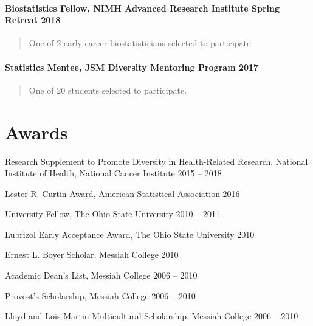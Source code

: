 \documentclass[
  fleqn, oneside]{article}
\begin{document}
\hypertarget{biostatistics-fellow-nimh-advanced-research-institute-spring-retreat-2018}{%
\paragraph{\texorpdfstring{Biostatistics Fellow, NIMH Advanced Research
Institute Spring Retreat
\hfill 2018}{Biostatistics Fellow, NIMH Advanced Research Institute Spring Retreat 2018}}\label{biostatistics-fellow-nimh-advanced-research-institute-spring-retreat-2018}}

\begin{quote}
One of 2 early-career biostatisticians selected to participate.
\end{quote}

\hypertarget{statistics-mentee-jsm-diversity-mentoring-program-2017}{%
\paragraph{\texorpdfstring{Statistics Mentee, JSM Diversity Mentoring
Program
\hfill 2017}{Statistics Mentee, JSM Diversity Mentoring Program 2017}}\label{statistics-mentee-jsm-diversity-mentoring-program-2017}}

\begin{quote}
One of 20 students selected to participate.
\end{quote}

\hypertarget{awards}{%
\section{Awards}\label{awards}}

Research Supplement to Promote Diversity in Health-Related Research,
National Institute of Health, National Cancer Institute \hfill 2015 --
2018

Lester R. Curtin Award, American Statistical Association \hfill 2016

University Fellow, The Ohio State University \hfill 2010 -- 2011

Lubrizol Early Acceptance Award, The Ohio State University \hfill 2010

Ernest L. Boyer Scholar, Messiah College \hfill 2010

Academic Dean's List, Messiah College \hfill 2006 -- 2010

Provost's Scholarship, Messiah College \hfill 2006 -- 2010

Lloyd and Lois Martin Multicultural Scholarship, Messiah College
\hfill 2006 -- 2010
\end{document}
